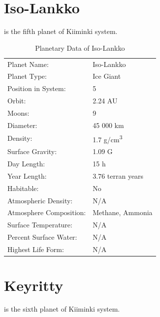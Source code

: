 \documentclass{tufte-book}
\begin{document}
\section{Iso-Lankko}

 is the fifth planet of Kiiminki system.

\bigskip
\begin{table}
\begin{minipage}{\textwidth}
\begin{center}
\begin{tabular}{ll}
\toprule
Planet Name: & Iso-Lankko \\
Planet Type: & Ice Giant \\
Position in System: & 5 \\
Orbit: & 2.24 AU \\
Moons: & 9 \\
Diameter: & 45 000 km \\
Density: & 1.7 g/cm\textsuperscript{3} \\
Surface Gravity: & 1.09 G \\
Day Length: & 15 h \\
Year Length: & 3.76 terran years \\
Habitable: & No \\
\quad Atmospheric Density: & N/A \\
\quad Atmosphere Composition: & Methane, Ammonia \\
\quad Surface Temperature: & N/A \\
\quad Percent Surface Water: & N/A \\
\quad Highest Life Form: & N/A \\

\bottomrule
\end{tabular}
\end{center}
\end{minipage}
\caption{Planetary Data of Iso-Lankko}
\end{table}


\section{Keyritty}

 is the sixth planet of Kiiminki system.
\end{document}
